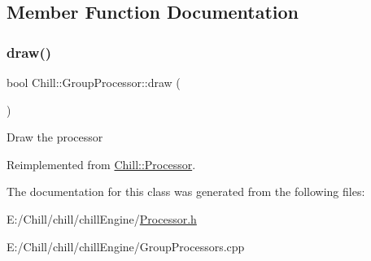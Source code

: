 \subsection{Member Function Documentation}
\mbox{\label{class_chill_1_1_group_processor_a6c3eadfcb171c48a2d76bebefd153fcb}} 
\subsubsection{\texorpdfstring{draw()}{draw()}}
{\footnotesize\ttfamily bool Chill\+::\+Group\+Processor\+::draw (\begin{DoxyParamCaption}{ }\end{DoxyParamCaption})\hspace{0.3cm}{\ttfamily [virtual]}}

Draw the processor 

Reimplemented from \mbox{\hyperlink{class_chill_1_1_processor_a2eb86d9750e1c0d5ac7f6da166aca8fd}{Chill\+::\+Processor}}.



The documentation for this class was generated from the following files\+:\begin{DoxyCompactItemize}
\item 
E\+:/\+Chill/chill/chill\+Engine/\mbox{\hyperlink{_processor_8h}{Processor.\+h}}\item 
E\+:/\+Chill/chill/chill\+Engine/Group\+Processors.\+cpp\end{DoxyCompactItemize}
